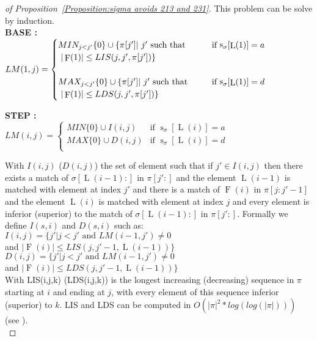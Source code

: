 \documentclass[a4paper]{llncs}
\newcommand{\ptext}{\pi}
\newcommand{\pmotif}{\sigma}
\DeclareMathOperator{\stripea}{s}
\newcommand{\stripe}[2]{\stripea_{{#1}}[{#2}]}
\newcounter{num}
\newcommand{\dstep}{d}
\newcommand{\ustep}{a}
\DeclareMathOperator{\firsta}{L}
\newcommand{\first}[1]{\firsta({#1})}
\DeclareMathOperator{\factora}{F}
\newcommand{\factor}[1]{\factora({#1})}
\begin{document}
\begin{proof}[of Proposition~\ref{Proposition:sigma avoids 213 and 231}]
This problem can be solve by induction.\\


			
\textbf{BASE :} \\
$
LM(1,j)=
\begin{cases}
		MIN_{j<j'}\{0\} \cup \{\ptext[j'] |\text{ $j'$ such that \indent } & 
			\text{if $\stripe{\pmotif}{\first{1}}=\ustep$} \\
		\text{ $|\factor{1}| \leq LIS(j,j',\ptext[j'])  $}\}& \\
		&\\	
		MAX_{j<j'}\{0\} \cup \{\ptext[j'] |\text{ $j'$ such that \indent } &
			\text{if $\stripe{\pmotif}{\first{1}}=\dstep$} \\
		\text{ $|\factor{1}| \leq LDS(j,j',\ptext[j']) $}\}&\\			
\end{cases}
$

\textbf{STEP :} \\
$
LM(i,j)=
\begin{cases}
	MIN \{0\} \cup  I(i,j) & 
	\text{if $\stripe{\pmotif}{\first{i}}=\ustep$}\\
	MAX \{0\} \cup  D(i,j) & 
	\text{if $\stripe{\pmotif}{\first{i}}=\dstep$}\\		
\end{cases}
$

					
With $I(i,j)$ ($D(i,j)$) the set of element such that
if  $j' \in I(i,j)$ then there exists 
a match of $\pmotif[\first{i-1}:]$ in $\ptext[j':]$ and
the element $\first{i-1}$ is matched with element at index $j'$ and
there is a match of $\factor{i}$ in $\ptext[j:j'-1]$ and
the element $\first{i}$ is matched with element at index $j$ and every element is inferior (superior) to the match of  
$\pmotif[\first{i-1}:]$ in $\ptext[j':]$.
Formally we define $I(s,i)$ and $D(s,i)$ such as:\\
			
$I(i,j)=\{j'|\text{$j<j'$ and $LM(i-1,j')\neq 0$}$ \\
\indent \indent \indent and  $|\factor{i}| \leq LIS(j,j'-1,\first{i-1})\}$ \\

$D(i,j)=\{j'|\text{$j<j'$ and $LM(i-1,j')\neq 0$}$ \\
\indent \indent \indent and  $|\factor{i}| \leq LDS(j,j'-1,\first{i-1}) \}$ \\
					                       
With LIS(i,j,k) (LDS(i,j,k)) is the longest increasing (decreasing) sequence in $\ptext$ starting at $i$ and ending at $j$,
with every element of this sequence
inferior (superior) to $k$. 
LIS and LDS can be computed in $O(|\ptext|^2*log(log(|\ptext|)))$ (see \cite{Bespamyatnikh00enumeratinglongest}).\\
			

\end{proof}
\end{document}
